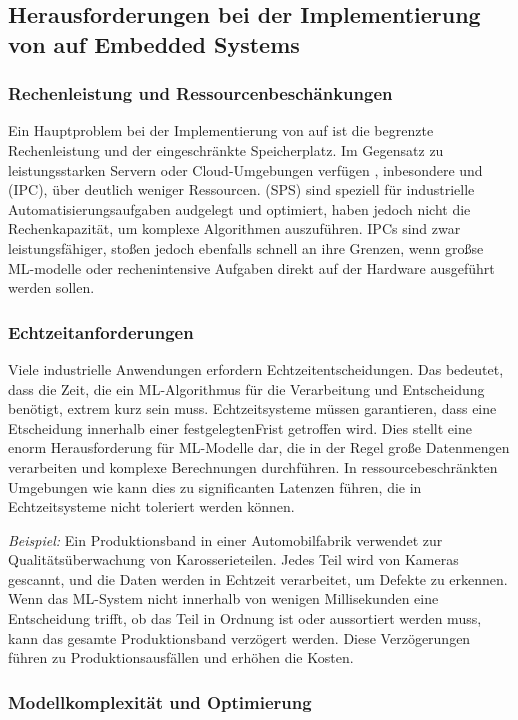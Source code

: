 \subsection{Herausforderungen bei der Implementierung von \ML auf Embedded Systems}
\subsubsection{Rechenleistung und Ressourcenbeschänkungen}

Ein Hauptproblem bei der Implementierung von \ML auf \Emb ist die begrenzte Rechenleistung und der eingeschränkte Speicherplatz.
Im Gegensatz zu leistungsstarken Servern oder Cloud-Umgebungen verfügen \Emb, inbesondere \SPS und \IPC (IPC), über deutlich weniger 
Ressourcen. \SPS (SPS) sind speziell für industrielle Automatisierungsaufgaben audgelegt und optimiert, haben jedoch nicht die 
Rechenkapazität, um komplexe \ML Algorithmen auszuführen. IPCs sind zwar leistungsfähiger, stoßen jedoch ebenfalls schnell an ihre 
Grenzen, wenn großse ML-modelle oder rechenintensive Aufgaben direkt auf der Hardware ausgeführt werden sollen.

\subsubsection{Echtzeitanforderungen}

Viele industrielle Anwendungen erfordern Echtzeitentscheidungen. Das bedeutet, dass die Zeit, die ein ML-Algorithmus für die 
Verarbeitung und Entscheidung benötigt, extrem kurz sein muss. Echtzeitsysteme müssen garantieren, dass eine Etscheidung innerhalb 
einer festgelegtenFrist getroffen wird. Dies stellt eine enorm Herausforderung für ML-Modelle dar, die in der Regel große Datenmengen
verarbeiten und komplexe Berechnungen durchführen. In ressourcebeschränkten Umgebungen wie \Emb kann dies zu significanten Latenzen 
führen, die in Echtzeitsysteme nicht toleriert werden können.

\textit{Beispiel:} 
Ein Produktionsband in einer Automobilfabrik verwendet \ML zur Qualitätsüberwachung von Karosserieteilen. 
Jedes Teil wird von Kameras gescannt, und die Daten werden in Echtzeit verarbeitet, um Defekte zu erkennen. Wenn das ML-System 
nicht innerhalb von wenigen Millisekunden eine Entscheidung trifft, ob das Teil in Ordnung ist oder aussortiert werden muss, 
kann das gesamte Produktionsband verzögert werden. Diese Verzögerungen führen zu Produktionsausfällen und erhöhen die Kosten.

\subsubsection{Modellkomplexität und Optimierung}

